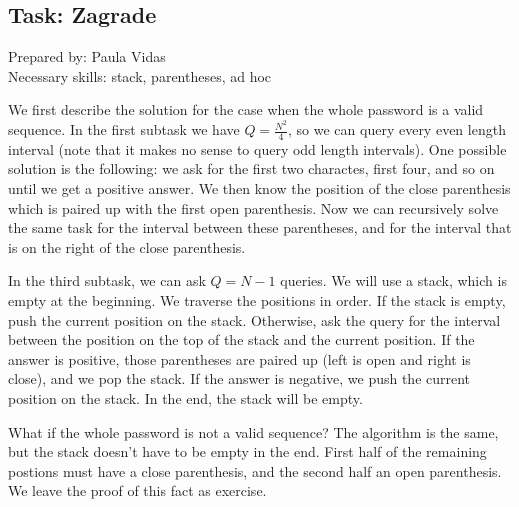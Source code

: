 \subsection*{Task: Zagrade}
\textsf{Prepared by: Paula Vidas}\\
\textsf{Necessary skills: stack, parentheses, ad hoc}

We first describe the solution for the case when the whole password is a valid
sequence. In the first subtask we have $Q = \frac{N^2}{4}$, so we can query
every even length interval (note that it makes no sense to query odd length
intervals). One possible solution is the following: we ask for the first two
charactes, first four, and so on until we get a positive answer. 
We then know the position of the close parenthesis which is paired up 
with the first open
parenthesis. Now we can recursively solve the same task
for the interval between these parentheses, and for the interval that is on the
right of the close parenthesis.

In the third subtask, we can ask $Q = N - 1$ queries. We will use a stack, which
is empty at the beginning. We traverse the positions in order. If the stack is
empty, push the current position on the stack. Otherwise, ask the query for the
interval between the position on the top of the stack and the current position. 
If the answer is
positive, those parentheses are paired up (left is open and right
is close), and we pop the stack. If the answer
is negative, we push the current position on the stack. In the end, the stack
will be empty.

What if the whole password is not a valid sequence? The algorithm is the same,
but the stack doesn't have to be empty in the end. First half of
the remaining postions must have a close parenthesis, and the second half an
open parenthesis. We leave the proof of this fact as exercise.
